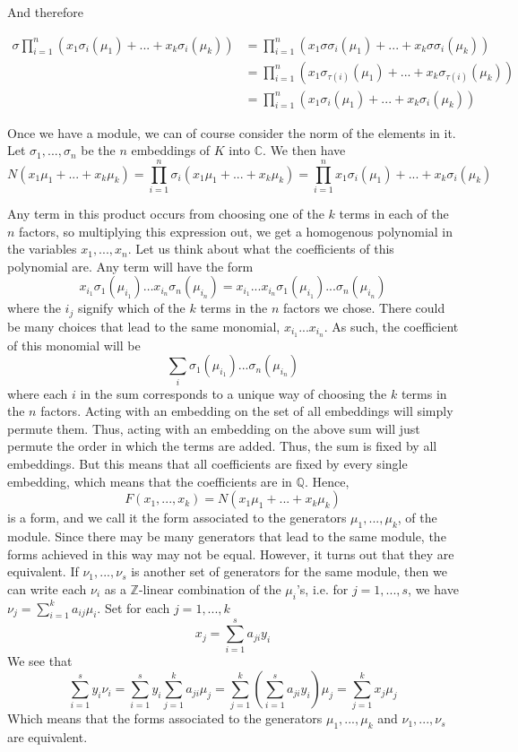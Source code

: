 \documentclass{article}
\newcommand{\mbb}[1]{\mathbb{#1}}
\begin{document}
And therefore 

\begin{align*}
    \sigma \prod_{i = 1}^n \left(x_1 \sigma_i(\mu_1) + ... + x_k \sigma_i(\mu_k) \right) &= \prod_{i = 1}^n \left(x_1 \sigma\sigma_i(\mu_1) + ... + x_k \sigma\sigma_i(\mu_k) \right) \\ 
    &= \prod_{i = 1}^n \left(x_1 \sigma_{\tau(i)}(\mu_1) + ... + x_k \sigma_{\tau(i)}(\mu_k) \right) \\
    &= \prod_{i = 1}^n \left(x_1 \sigma_{i}(\mu_1) + ... + x_k \sigma_{i}(\mu_k) \right)
\end{align*}



Once we have a module, we can of course consider the norm of the elements in it. Let $\sigma_1, ..., \sigma_n$ be the $n$ embeddings of $K$ into $\mbb{C}$. We then have
$$N(x_1 \mu_1 + ... + x_k \mu_k) = \prod_{i = 1}^n \sigma_i(x_1 \mu_1 + ... + x_k \mu_k) = \prod_{i = 1}^n x_1 \sigma_i(\mu_1) + ... + x_k \sigma_i(\mu_k)$$



Any term in this product occurs from choosing one of the $k$ terms in each of the $n$ factors, so multiplying this expression out, we get a homogenous polynomial in the variables $x_1, ..., x_n$. Let us think about what the coefficients of this polynomial are. Any term will have the form
$$x_{i_1}\sigma_1(\mu_{i_1}) \dots x_{i_n}\sigma_n(\mu_{i_n}) = x_{i_1} ... x_{i_n} \sigma_1(\mu_{i_1})... \sigma_n(\mu_{i_n})$$
where the $i_j$ signify which of the $k$ terms in the $n$ factors we chose. There could be many choices that lead to the same monomial, $x_{i_1}...x_{i_n}$. As such, the coefficient of this monomial will be
$$\sum_{i} \sigma_1(\mu_{i_1})... \sigma_n(\mu_{i_n})$$
where each $i$ in the sum corresponds to a unique way of choosing the $k$ terms in the $n$ factors. Acting with an embedding on the set of all embeddings will simply permute them. Thus, acting with an embedding on the above sum will just permute the order in which the terms are added. Thus, the sum is fixed by all embeddings. But this means that all coefficients are fixed by every single embedding, which means that the coefficients are in $\mbb{Q}$. Hence, $$F(x_1, ..., x_k) = N(x_1 \mu_1 + ... + x_k \mu_k)$$ 
is a form, and we call it the form associated to the generators $\mu_1, ..., \mu_k$, of the module. Since there may be many generators that lead to the same module, the forms achieved in this way may not be equal. However, it turns out that they are equivalent. If $\nu_1, ...,\nu_s$ is another set of generators for the same module, then we can write each $\nu_i$ as a $\mbb{Z}$-linear combination of the $\mu_i$'s, i.e. for $j = 1, ..., s$, we have
$\nu_j = \sum_{i=1}^k a_{ij} \mu_i$. Set for each $j = 1, ..., k$ 
$$x_j = \sum_{i=1}^s a_{ji} y_i$$
We see that
$$\sum_{i=1}^s y_i \nu_i = \sum_{i=1}^s y_i \sum_{j=1}^k a_{ji} \mu_j = \sum_{j=1}^k (\sum_{i=1}^s a_{ji} y_i) \mu_j = \sum_{j=1}^k x_j \mu_j$$
Which means that the forms associated to the generators $\mu_1, ..., \mu_k$ and $\nu_1, ..., \nu_s$ are equivalent. 
\end{document}
